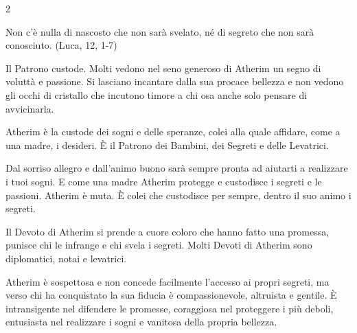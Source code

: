 \begin{multicols}{2}
\begin{enfasi}
{\medskip

Non c'è nulla di nascosto che non sarà svelato, né di segreto che non sarà conosciuto. (Luca, 12, 1-7)
}\end{enfasi}

Il Patrono custode. Molti vedono nel seno generoso di Atherim un segno di voluttà e passione. Si lasciano incantare dalla sua procace bellezza e non vedono gli occhi di cristallo che incutono timore a chi osa anche solo pensare di avvicinarla.

Atherim è la custode dei sogni e delle speranze, colei alla quale affidare, come a una madre, i desideri. È il Patrono dei Bambini, dei Segreti e delle Levatrici.

Dal sorriso allegro e dall'animo buono sarà sempre pronta ad aiutarti a realizzare i tuoi sogni. E come una madre Atherim protegge e custodisce i segreti e le passioni. Atherim è muta. È colei che custodisce per sempre, dentro il suo animo i segreti.

Il Devoto di Atherim si prende a cuore coloro che hanno fatto una promessa, punisce chi le infrange e chi svela i segreti. Molti Devoti di Atherim sono diplomatici, notai e levatrici.

Atherim è sospettosa e non concede facilmente l'accesso ai propri segreti, ma verso chi ha conquistato la sua fiducia è compassionevole, altruista e gentile. È intransigente nel difendere le promesse, coraggiosa nel proteggere i più deboli, entusiasta nel realizzare i sogni e vanitosa della propria bellezza.


\end{multicols}
